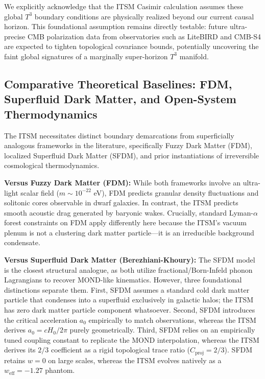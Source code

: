 \documentclass[aps,prd,10pt,twocolumn,superscriptaddress,nofootinbib,floatfix]{revtex4-2}
\begin{document}
We explicitly acknowledge that the ITSM Casimir calculation assumes these global $T^3$ boundary conditions are physically realized beyond our current causal horizon. This foundational assumption remains directly testable: future ultra-precise CMB polarization data from observatories such as LiteBIRD and CMB-S4 are expected to tighten topological covariance bounds, potentially uncovering the faint global signatures of a marginally super-horizon $T^3$ manifold.

\subsection{Comparative Theoretical Baselines: FDM, Superfluid Dark Matter, and Open-System Thermodynamics}

The ITSM necessitates distinct boundary demarcations from superficially analogous frameworks in the literature, specifically Fuzzy Dark Matter (FDM), localized Superfluid Dark Matter (SFDM), and prior instantiations of irreversible cosmological thermodynamics.

\textbf{Versus Fuzzy Dark Matter (FDM):} While both frameworks involve an ultra-light scalar field ($m \sim 10^{-22}$ eV), FDM predicts granular density fluctuations and solitonic cores observable in dwarf galaxies. In contrast, the ITSM predicts smooth acoustic drag generated by baryonic wakes. Crucially, standard Lyman-$\alpha$ forest constraints on FDM apply differently here because the ITSM's vacuum plenum is not a clustering dark matter particle---it is an irreducible background condensate. 

\textbf{Versus Superfluid Dark Matter (Berezhiani-Khoury):} The SFDM model \cite{sf_dm} is the closest structural analogue, as both utilize fractional/Born-Infeld phonon Lagrangians to recover MOND-like kinematics. However, three foundational distinctions separate them. First, SFDM assumes a standard cold dark matter particle that condenses into a superfluid exclusively in galactic halos; the ITSM has zero dark matter particle component whatsoever. Second, SFDM introduces the critical acceleration $a_0$ empirically to match observations, whereas the ITSM derives $a_0 = c H_0 / 2\pi$ purely geometrically. Third, SFDM relies on an empirically tuned coupling constant to replicate the MOND interpolation, whereas the ITSM derives its $2/3$ coefficient as a rigid topological trace ratio ($C_{\text{proj}} = 2/3$). SFDM retains $w=0$ on large scales, whereas the ITSM evolves natively as a $w_{\text{eff}}=-1.27$ phantom.
\end{document}
